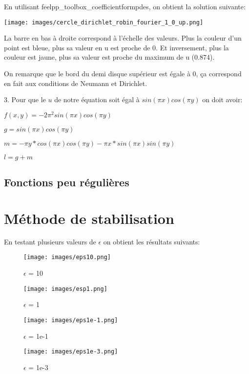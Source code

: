 \documentclass{article}
\begin{document}
En utilisant feelpp\_toolbox\_coefficientformpdes, on obtient la solution suivante:

\texttt{[image: images/cercle\_dirichlet\_robin\_fourier\_1\_0\_up.png]}

La barre en bas à droite correspond à l'échelle des valeurs. Plus la couleur d'un point est bleue, plus sa valeur en u est proche de 0. Et inversement, plus la couleur est jaune, plus sa valeur est proche du maximum de u (0.874).

On remarque que le bord du demi disque supérieur est égale à 0, ça correspond en fait aux conditions de Neumann et Dirichlet.

3. Pour que le $u$ de notre équation soit égal à $sin(\pi x) cos(\pi y)$ on doit avoir:

$f(x,y) = -2 \pi^2 sin(\pi x) cos(\pi y)$

$g = sin(\pi x) cos(\pi y)$

$m = -\pi y * cos(\pi x)cos(\pi y)-\pi x*sin(\pi x) sin(\pi y)$

$l = g+m$

\subsection{Fonctions peu régulières}

\section{Méthode de stabilisation}

En testant plusieurs valeurs de $\epsilon$ on obtient les résultats suivants:

\begin{figure}
    \centering
    \texttt{[image: images/eps10.png]}
    \caption{$\epsilon$ = 10}
\end{figure}
\begin{figure}
    \centering
    \texttt{[image: images/esp1.png]}
    \caption{$\epsilon$ = 1}
\end{figure}
\begin{figure}
    \centering
    \texttt{[image: images/eps1e-1.png]}
    \caption{$\epsilon$ = 1e-1}
\end{figure}  
\begin{figure}
    \centering
    \texttt{[image: images/eps1e-3.png]}
    \caption{$\epsilon$ = 1e-3}
\end{figure}
\end{document}
